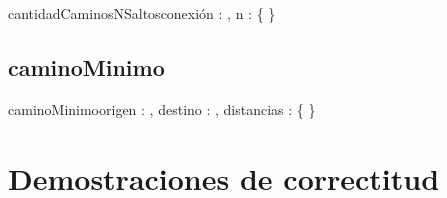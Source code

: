 \documentclass[10pt,a4paper]{article}
\begin{document}
\begin{proc}{cantidadCaminosNSaltos}{\Inout conexión : \TLista{\TLista{\ent}}, \In n : \ent}{ \{ } 
\asegura{\{\True\}}
\}
\end{proc}

\subsection{caminoMinimo}

\begin{proc}{caminoMinimo}{\In origen : \ent, \In destino : \ent, \In distancias : \TLista{\TLista{\ent}}}{\TLista{\ent} \{ } 
\requiere{\{ \True \}}
\asegura{\{\True\}}
\}
\end{proc}

\section{Demostraciones de correctitud}
\end{document}
